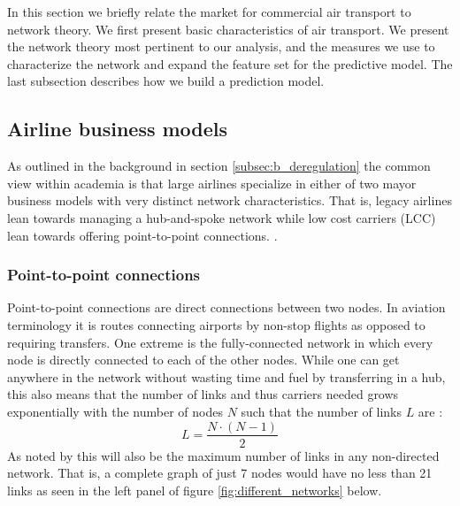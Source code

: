 \label{sec:theory}
In this section we briefly relate the market for commercial air transport to network theory. We first present basic characteristics of air transport. We present the network theory most pertinent to our analysis, and the measures we use to characterize the network and expand the feature set for the predictive model. The last subsection describes how we build a prediction model. 

\subsection{Airline business models}
As outlined in the background in section \ref{subsec:b_deregulation} the common view within academia is that large airlines specialize in either of two mayor business models with very distinct network characteristics. That is, legacy airlines lean towards managing a hub-and-spoke network while low cost carriers (LCC) lean towards offering point-to-point connections. \citep{daraban2012low,baker2013service,marti2015efficiency}.

\subsubsection{Point-to-point connections}
Point-to-point connections are direct connections between two nodes. In aviation terminology it is routes connecting airports by non-stop flights as opposed to requiring transfers. One extreme is the fully-connected network in which every node is directly connected to each of the other nodes. While one can get anywhere in the network without wasting time and fuel by transferring in a hub, this also means that the number of links and thus carriers needed grows exponentially with the number of nodes $N$ such that the number of links $L$ are \citep{bryan1999hub}:
\begin{equation}
  L=\frac{N\cdot(N-1)}{2}
  \label{eq:max_links}
\end{equation}
As noted by \citet{barabasi2016networks} this will also be the maximum number of links in any non-directed network. That is, a complete graph of just 7 nodes would have no less than 21 links as seen in the left panel of figure \ref{fig:different_networks} below.

